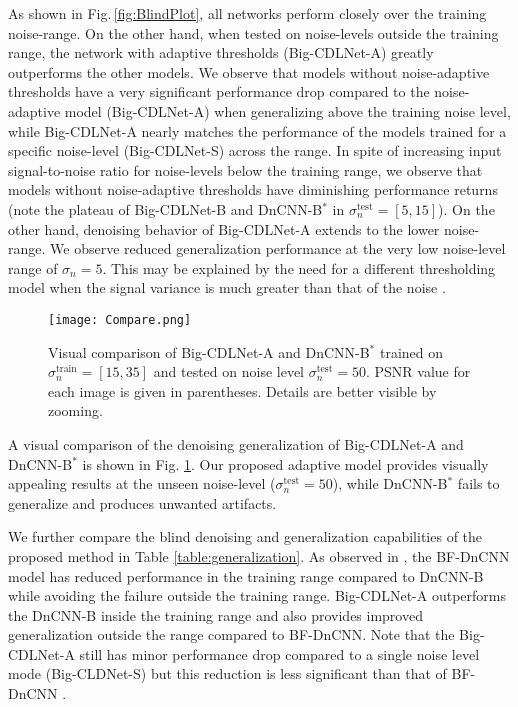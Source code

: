 \documentclass[conference]{IEEEtran}
\begin{document}
As shown in Fig.\,\ref{fig:BlindPlot}, all networks perform closely over the training noise-range. On the other hand, when tested on noise-levels outside the training range, the network with adaptive thresholds (Big-CDLNet-A) greatly outperforms the other models. We observe that models without noise-adaptive thresholds have a very significant performance drop compared to the noise-adaptive model (Big-CDLNet-A) when generalizing above the training noise level, while Big-CDLNet-A nearly matches the performance of the models trained for a specific noise-level (Big-CDLNet-S) across the range. In spite of increasing input signal-to-noise ratio for noise-levels below the training range, we  observe that models without noise-adaptive thresholds have diminishing performance returns (note the plateau of Big-CDLNet-B and DnCNN-B$^{\ast}$ in $\sigma_n^{\mathrm{test}}=[5,15]$). On the other hand, denoising behavior of Big-CDLNet-A extends to the lower noise-range. We observe reduced generalization performance at the very low noise-level range of $\sigma_n = 5$. This may be explained by the need for a different thresholding model when the signal variance is much greater than that of the noise \cite{Mallat}.

\begin{figure}[ht]
\centering
\texttt{[image: Compare.png]}
\caption{Visual comparison of Big-CDLNet-A and DnCNN-B$^{\ast}$ trained on $\sigma_n^{\mathrm{train}} = [15,35]$ and tested on noise level $\sigma_n^{\mathrm{test}}=50$. PSNR value for each image is given in parentheses. Details are better visible by zooming.}
\label{fig:Parrot}
\end{figure}

A visual comparison of the denoising generalization of Big-CDLNet-A and DnCNN-B$^\ast$ is shown in Fig. \ref{fig:Parrot}. Our proposed adaptive model provides visually appealing results at the unseen noise-level ($\sigma_n^{\mathrm{test}}=50$), while DnCNN-B$^\ast$ fails to generalize and produces unwanted artifacts.

We further compare the blind denoising and generalization capabilities of the proposed method in Table \ref{table:generalization}. As observed in \cite{Mohan2020}, the BF-DnCNN model has reduced performance in the training range compared to DnCNN-B while avoiding the failure outside the training range. Big-CDLNet-A outperforms the DnCNN-B inside the training range and also provides improved generalization outside the range compared to BF-DnCNN. Note that the Big-CDLNet-A still has minor performance drop compared to a single noise level mode (Big-CLDNet-S) but this reduction is less significant than that of BF-DnCNN \cite{Mohan2020}. 
\end{document}

